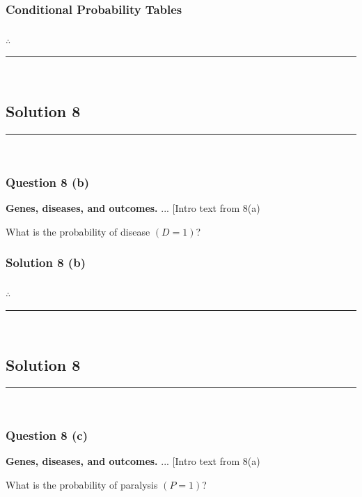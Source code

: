 \documentclass{article}
\begin{document}
\subsubsection*{Conditional Probability Tables}


\subsubsection*{\normalfont}{$\therefore$ }

\noindent\rule{\textwidth}{0.4pt}\\

\newpage

\subsection*{Solution 8}
\noindent\rule{\textwidth}{0.4pt}\\
\subsubsection*{Question 8 (b)}
\begin{flushleft}
    \textbf{Genes, diseases, and outcomes.} ... [Intro text from 8(a)  

    What is the probability of disease $(D=1)$? 
\end{flushleft}

\subsubsection*{Solution 8 (b)}


\subsubsection*{\normalfont}{$\therefore$ }

\noindent\rule{\textwidth}{0.4pt}\\

\newpage

\subsection*{Solution 8}
\noindent\rule{\textwidth}{0.4pt}\\
\subsubsection*{Question 8 (c)}
\begin{flushleft}
    \textbf{Genes, diseases, and outcomes.} ... [Intro text from 8(a)  

    What is the probability of paralysis $(P=1)$? 
\end{flushleft}
\end{document}
